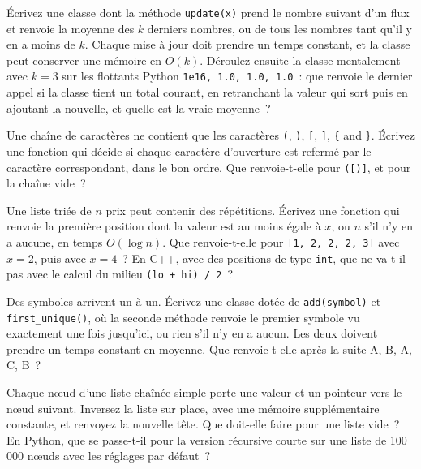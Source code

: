 \begin{question}\label{iq:iv3:algorithms:4}
Écrivez une classe dont la méthode \texttt{update(x)} prend le nombre suivant d'un flux et renvoie la moyenne des $k$ derniers nombres, ou de tous les nombres tant qu'il y en a moins de $k$. Chaque mise à jour doit prendre un temps constant, et la classe peut conserver une mémoire en $O(k)$. Déroulez ensuite la classe mentalement avec $k = 3$ sur les flottants Python \texttt{1e16, 1.0, 1.0, 1.0}~: que renvoie le dernier appel si la classe tient un total courant, en retranchant la valeur qui sort puis en ajoutant la nouvelle, et quelle est la vraie moyenne~?
\end{question}

\begin{question}\label{iq:iv3:algorithms:5}
Une chaîne de caractères ne contient que les caractères \texttt{(}, \texttt{)}, \texttt{[}, \texttt{]}, \texttt{\{} and \texttt{\}}. Écrivez une fonction qui décide si chaque caractère d'ouverture est refermé par le caractère correspondant, dans le bon ordre. Que renvoie-t-elle pour \texttt{([)]}, et pour la chaîne vide~?
\end{question}

\begin{question}\label{iq:iv3:algorithms:6}
Une liste triée de $n$ prix peut contenir des répétitions. Écrivez une fonction qui renvoie la première position dont la valeur est au moins égale à $x$, ou $n$ s'il n'y en a aucune, en temps $O(\log n)$. Que renvoie-t-elle pour \texttt{[1, 2, 2, 2, 3]} avec $x = 2$, puis avec $x = 4$~? En C++, avec des positions de type \texttt{int}, que ne va-t-il pas avec le calcul du milieu \texttt{(lo + hi) / 2}~?
\end{question}

\begin{question}\label{iq:iv3:algorithms:7}
Des symboles arrivent un à un. Écrivez une classe dotée de \texttt{add(symbol)} et \texttt{first\_unique()}, où la seconde méthode renvoie le premier symbole vu exactement une fois jusqu'ici, ou rien s'il n'y en a aucun. Les deux doivent prendre un temps constant en moyenne. Que renvoie-t-elle après la suite A, B, A, C, B~?
\end{question}

\begin{question}\label{iq:iv3:algorithms:8}
Chaque nœud d'une liste chaînée simple porte une valeur et un pointeur vers le nœud suivant. Inversez la liste sur place, avec une mémoire supplémentaire constante, et renvoyez la nouvelle tête. Que doit-elle faire pour une liste vide~? En Python, que se passe-t-il pour la version récursive courte sur une liste de 100\,000 nœuds avec les réglages par défaut~?
\end{question}

